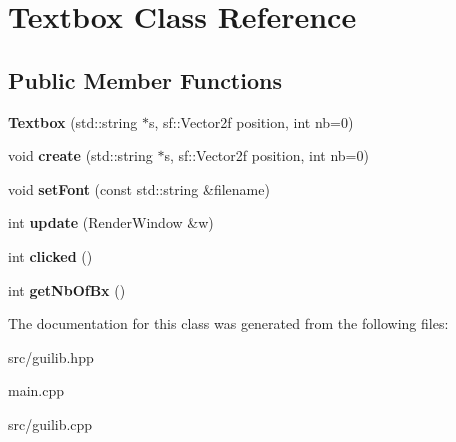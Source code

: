 \hypertarget{class_textbox}{}\section{Textbox Class Reference}
\label{class_textbox}
\subsection*{Public Member Functions}
\begin{DoxyCompactItemize}
\item 
{\bfseries Textbox} (std\+::string $\ast$s, sf\+::\+Vector2f position, int nb=0)\hypertarget{class_textbox_a3012a48f019d162a425c789861bb1990}{}\label{class_textbox_a3012a48f019d162a425c789861bb1990}

\item 
void {\bfseries create} (std\+::string $\ast$s, sf\+::\+Vector2f position, int nb=0)\hypertarget{class_textbox_a0041248c755db7199af083f72eff1450}{}\label{class_textbox_a0041248c755db7199af083f72eff1450}

\item 
void {\bfseries set\+Font} (const std\+::string \&filename)\hypertarget{class_textbox_ab9621713182598984ad3fb859d0e1d9f}{}\label{class_textbox_ab9621713182598984ad3fb859d0e1d9f}

\item 
int {\bfseries update} (Render\+Window \&w)\hypertarget{class_textbox_acde79fe8b1e486111d64ee8867c7acc7}{}\label{class_textbox_acde79fe8b1e486111d64ee8867c7acc7}

\item 
int {\bfseries clicked} ()\hypertarget{class_textbox_a1e22453d60cefece0d06a92aa257c438}{}\label{class_textbox_a1e22453d60cefece0d06a92aa257c438}

\item 
int {\bfseries get\+Nb\+Of\+Bx} ()\hypertarget{class_textbox_abe733f2845e2d532a0a364517ff00ba2}{}\label{class_textbox_abe733f2845e2d532a0a364517ff00ba2}

\end{DoxyCompactItemize}


The documentation for this class was generated from the following files\+:\begin{DoxyCompactItemize}
\item 
src/guilib.\+hpp\item 
main.\+cpp\item 
src/guilib.\+cpp\end{DoxyCompactItemize}
